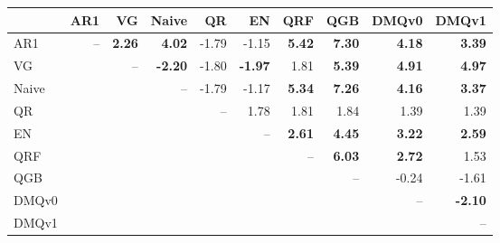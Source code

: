 \begin{tabular}{lrrrrrrrrr}
\toprule
 & AR1 & VG & Naive & QR & EN & QRF & QGB & DMQv0 & DMQv1 \\
\midrule
AR1 & -- & \textbf{2.26} & \textbf{4.02} & -1.79 & -1.15 & \textbf{5.42} & \textbf{7.30} & \textbf{4.18} & \textbf{3.39} \\
VG &  & -- & \textbf{-2.20} & -1.80 & \textbf{-1.97} & 1.81 & \textbf{5.39} & \textbf{4.91} & \textbf{4.97} \\
Naive &  &  & -- & -1.79 & -1.17 & \textbf{5.34} & \textbf{7.26} & \textbf{4.16} & \textbf{3.37} \\
QR &  &  &  & -- & 1.78 & 1.81 & 1.84 & 1.39 & 1.39 \\
EN &  &  &  &  & -- & \textbf{2.61} & \textbf{4.45} & \textbf{3.22} & \textbf{2.59} \\
QRF &  &  &  &  &  & -- & \textbf{6.03} & \textbf{2.72} & 1.53 \\
QGB &  &  &  &  &  &  & -- & -0.24 & -1.61 \\
DMQv0 &  &  &  &  &  &  &  & -- & \textbf{-2.10} \\
DMQv1 &  &  &  &  &  &  &  &  & -- \\
\bottomrule
\end{tabular}
